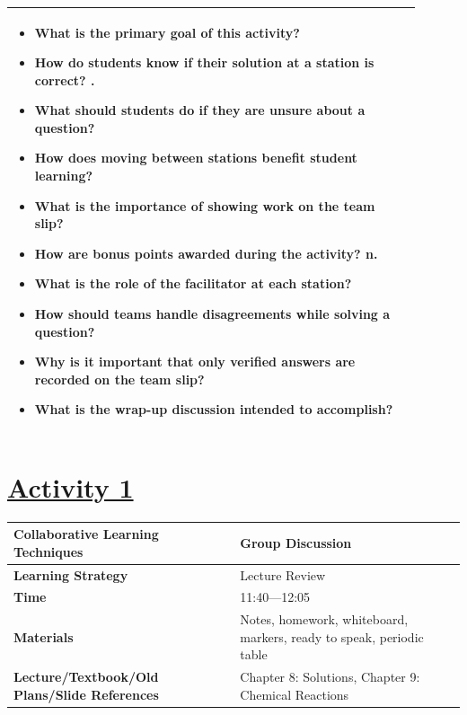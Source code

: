 \documentclass{article}
\begin{document}
\begin{tabular}{|p{0.9\linewidth}|}
\hline
\begin{itemize}
    \item What is the primary goal of this activity?

    
    \item How do students know if their solution at a station is correct?
.
    
    \item What should students do if they are unsure about a question?

    
    \item How does moving between stations benefit student learning?

    
    \item What is the importance of showing work on the team slip?

    
    \item How are bonus points awarded during the activity?
n.
    
    \item What is the role of the facilitator at each station?

    
    \item How should teams handle disagreements while solving a question?

    
    \item Why is it important that only verified answers are recorded on the team slip?

    
    \item What is the wrap-up discussion intended to accomplish?
\end{itemize} \\
\hline
\end{tabular}




\section*{\underline{Activity 1}}
\noindent
\begin{tabular}{|p{4.2cm}|p{9.8cm}|}
\hline
\textbf{Collaborative Learning Techniques} & Group Discussion\\
\hline
\textbf{Learning Strategy} & Lecture Review\\
\hline
\textbf{Time} & 11:40---12:05\\
\hline
\textbf{Materials} & Notes, homework, whiteboard, markers, ready to speak, periodic table \\
\hline
\textbf{Lecture/Textbook/Old Plans/Slide References} & Chapter 
8: Solutions, Chapter 9: Chemical Reactions\\
\hline
\end{tabular}
\end{document}

